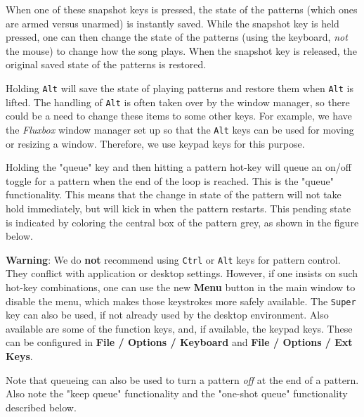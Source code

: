    When one of these snapshot keys is pressed, the state of the patterns
   (which ones are armed versus unarmed) is instantly saved.  While the
   snapshot key is held pressed, one can then change the state of the patterns
   (using the keyboard, \textsl{not} the mouse)
   to change how the song plays.  When the snapshot key is released, the
   original saved state of the patterns is restored.

   Holding \texttt{Alt} will save the state of playing patterns and restore
   them when \texttt{Alt} is lifted.
   The handling of \texttt{Alt} is often taken over by the window
   manager, so there could be a need to change these items to some other
   keys.  For example, we have the \textsl{Fluxbox} window manager
   set up so that the \texttt{Alt} keys can
   be used for moving or resizing a window.  Therefore, we use
   keypad keys for this purpose.


   Holding the "queue" key and then hitting a pattern hot-key
   will queue an on/off toggle for a pattern when the end of the loop is
   reached.
   This is the "queue" functionality.
   This means that the change in state of the pattern will not take hold
   immediately, but will kick in when the pattern restarts.
   This pending state is indicated by coloring the central box of the
   pattern grey, as shown in the figure below.

   \textbf{Warning}:  We do \textbf{not}
   recommend using \texttt{Ctrl} or \texttt{Alt}
   keys for pattern control.  They conflict with application or desktop
   settings.  However, if one insists on such hot-key combinations,
   one can use the new \textbf{Menu} button in the main
   window to disable the menu, which makes those keystrokes more
   safely available.
   The \texttt{Super} key can also be used, if not already used by the desktop
   environment.  Also available are some of the function keys, and, if
   available, the keypad keys.  These can be configured in
   \textbf{File / Options / Keyboard} and
   \textbf{File / Options / Ext Keys}.

   Note that queueing can also be used to turn a pattern \textsl{off}
   at the end of a pattern.  Also note the "keep queue" functionality and
   the "one-shot queue" functionality described below.

